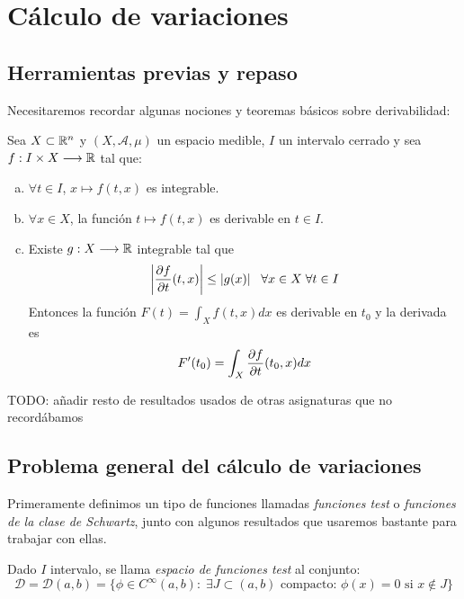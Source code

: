 \chapter{Cálculo de variaciones}

\section{Herramientas previas y repaso}

Necesitaremos recordar algunas nociones y teoremas básicos sobre derivabilidad:

\begin{theorem}
\label{derivadaparametro}
Sea $X\subset\mathbb{R}^n$ y $(X,\mathcal{A},\mu)$ un espacio medible, $I$ un intervalo cerrado y sea $f : I\times X \longrightarrow \mathbb{R}$ tal que:

\begin{enumerate}[(a)]
\item $\forall t \in I$, $x\mapsto f(t,x)$ es integrable.
\item $\forall x\in X$, la función $t\mapsto f(t,x)$ es derivable en $t\in I$.
\item Existe $g : X \longrightarrow \mathbb{R}$ integrable tal que
\[
\left|\frac{\partial f }{\partial t }(t,x)\right|\leq |g(x)| \;\;\; \forall x\in X\; \forall t \in I
\]
Entonces la función $F(t)=\int_Xf(t,x)dx$ es derivable en $t_0$ y la derivada es 
\[
F'(t_0)=\displaystyle\int_X\frac{\partial f }{\partial t }(t_0,x)dx
\]
\end{enumerate}

\end{theorem}

TODO: añadir resto de resultados usados de otras asignaturas que no recordábamos

\section{Problema general del cálculo de variaciones}

Primeramente definimos un tipo de funciones llamadas \textit{funciones test} o \textit{funciones de la clase de Schwartz}, junto con algunos resultados que usaremos bastante para trabajar con ellas.

\begin{definition}
\label{funcionestest}
Dado $I$ intervalo, se llama \textit{espacio de funciones test} al conjunto:
\[
\mathcal{D} = \mathcal{D}(a,b) = \{\phi\in C^{\infty}(a,b): \; \exists J\subset(a,b) \text{ compacto: } \phi(x)=0 \text{ si } x \notin J\}
\]
\end{definition}

